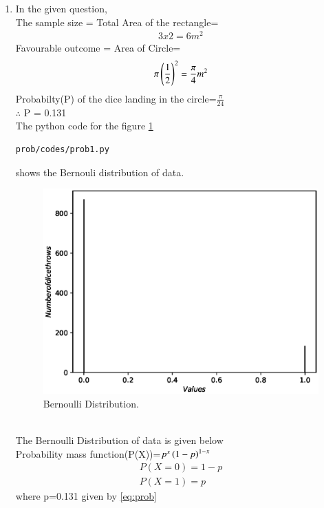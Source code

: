\renewcommand{\theequation}{\theenumi}
\begin{enumerate}[label=\arabic*.,ref=\thesubsubsection.\theenumi]

\item In the given question,
\\
The sample size = Total Area of the rectangle=
\begin{align}
3x2=6 m^2
\end{align}
Favourable outcome = Area of Circle=
\begin{align}
\pi\left(\frac{1}{2}\right)^2=\frac{\pi}{4} m^2 
\end{align}
Probabilty(P) of the dice landing in the circle=$\frac{\pi}{24}$
\\
$\therefore$ P = 0.131
\label{eq:prob}
\\
The python code for the figure \ref{fig:figure}
\begin{lstlisting}
prob/codes/prob1.py
\end{lstlisting}
shows the Bernouli distribution of data.
\begin{figure}[!ht]
\centering
\includegraphics[width=\columnwidth]{./prob/figs/prob1.eps}
\caption{Bernoulli Distribution.}
\label{fig:figure}
\end{figure}
\\
The Bernoulli Distribution of data is given below
\\
Probability mass function(P(X))=$p^x\left(1-p\right)^{1-x}$
\begin{align}
P(X=0)=1-p
\\
P(X=1)=p
\end{align}
where p=0.131 given by \ref{eq:prob}
\end{enumerate}